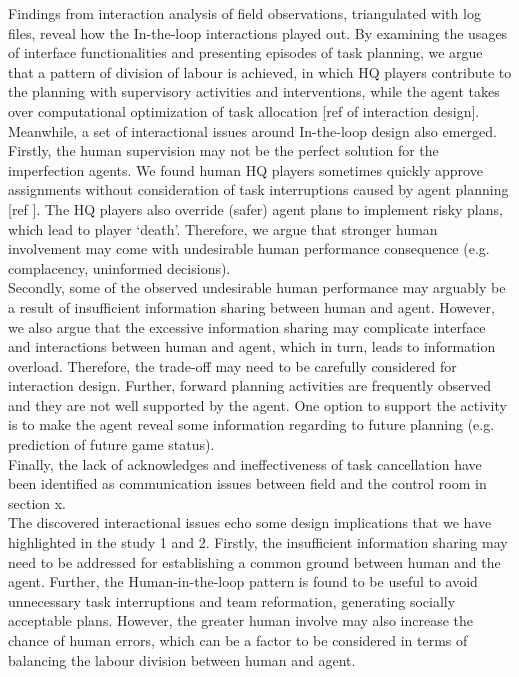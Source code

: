Findings from interaction analysis of field observations, triangulated with log files, reveal how the In-the-loop interactions played out. By examining the usages of interface functionalities and presenting episodes of task planning, we argue that a pattern of division of labour is achieved, in which HQ players contribute to the planning with supervisory activities and interventions, while the agent takes over computational optimization of task allocation [ref of interaction design]. Meanwhile, a set of interactional issues around In-the-loop design also emerged. \\

Firstly, the human supervision may not be the perfect solution for the imperfection agents. We found human HQ players sometimes quickly approve assignments without consideration of task interruptions caused by agent planning [ref ]. The HQ players also override (safer) agent plans to implement risky plans, which lead to player `death'. Therefore, we argue that stronger human  involvement may come with undesirable human performance consequence (e.g. complacency, uninformed decisions). \\

Secondly, some of the observed undesirable human performance may arguably be a result of insufficient information sharing between human and agent. However, we also argue that the excessive information sharing may complicate interface and interactions between human and agent, which in turn, leads to information overload. Therefore, the trade-off may need to be carefully considered for interaction design. Further, forward planning  activities are frequently observed and they are not well supported by the agent. One option to support the activity is to make the agent reveal some information regarding to future planning (e.g. prediction of future game status).\\

Finally, the lack of acknowledges and ineffectiveness of task cancellation have been identified as communication issues between field and the control room in section x. \\

The discovered interactional issues echo some design implications that we have highlighted in the study 1 and 2. Firstly, the insufficient information sharing may need to be addressed for establishing a common ground between human and the agent. Further, the Human-in-the-loop pattern is found to be useful to avoid unnecessary task interruptions and team reformation, generating socially acceptable plans. However, the greater human involve may also increase the chance of human errors, which can be a factor to be considered in terms of balancing the labour division between human and agent. \\

